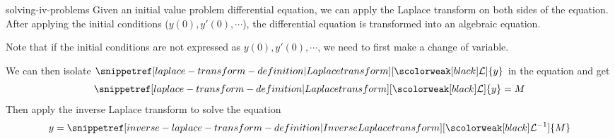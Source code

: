 \documentclass[preview]{standalone}
\begin{document}
\begin{snippet}{solving-iv-problems}
Given an initial value problem differential equation, we can apply the Laplace
transform on both sides of the equation. After applying the initial conditions
(\(y(0), y'(0), \cdots\)), the differential equation is transformed into an algebraic equation.

Note that if the initial conditions are not expressed as  \(y(0), y'(0), \cdots\),
we need to first make a change of variable.

We can then isolate \(\laplacetf\{y\}\) in the equation and get
\[
    \laplacetf\{y\} = M
\]
Then apply the inverse Laplace transform to solve the equation
\[
    y=\invlaplacetf\{M\}
\]
\end{snippet}

\end{document}
